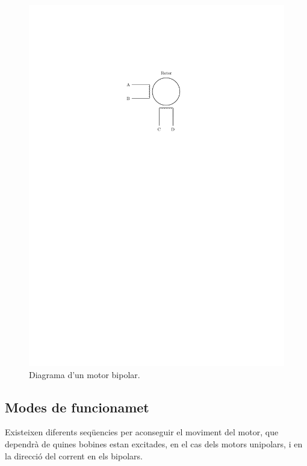 \begin{itemize}
		\begin{figure}[H]
		\centering
		\includegraphics{Bipolar}
		\caption{Diagrama d'un motor bipolar.}
		\label{fig:biipolar}
	\end{figure}
\end{itemize}

\subsection{Modes de funcionamet}
Existeixen diferents seqüencies per aconseguir el moviment del motor, que dependrà de quines bobines estan excitades, en el cas dels motors unipolars, i en la direcció del corrent en els bipolars. 

